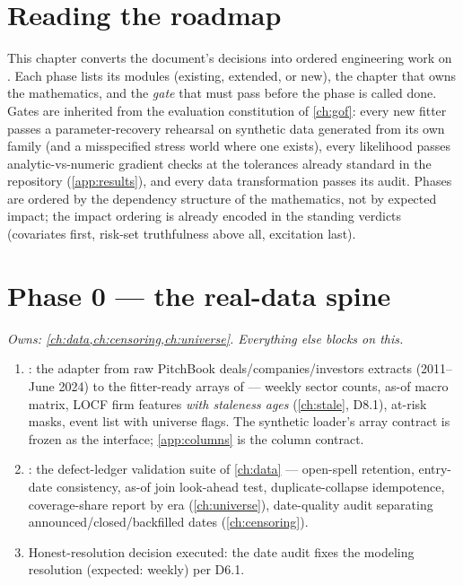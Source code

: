 
\section{Reading the roadmap}\label{ch13:sec:reading}

This chapter converts the document's decisions into ordered engineering
work on \modrepo{}. Each phase lists its modules (existing, extended, or
new), the chapter that owns the mathematics, and the \emph{gate} that
must pass before the phase is called done. Gates are inherited from the
evaluation constitution of \cref{ch:gof}: every new fitter passes a
parameter-recovery rehearsal on synthetic data generated from its own
family (and a misspecified stress world where one exists), every likelihood
passes analytic-vs-numeric gradient checks at the tolerances already
standard in the repository (\cref{app:results}), and every data
transformation passes its audit. Phases are ordered by the dependency
structure of the mathematics, not by expected impact; the impact
ordering is already encoded in the standing verdicts (covariates first,
risk-set truthfulness above all, excitation last).

\section{Phase 0 --- the real-data spine}\label{ch13:sec:phase0}

\emph{Owns: \cref{ch:data,ch:censoring,ch:universe}. Everything else
blocks on this.}

\begin{enumerate}[label=P0.\arabic*,leftmargin=3.2em]
\item {}: the adapter from raw PitchBook
deals/companies/investors extracts (2011--June 2024) to the fitter-ready
arrays of  --- weekly sector counts, as-of
macro matrix, LOCF firm features \emph{with staleness ages}
(\cref{ch:stale}, D8.1), at-risk masks, event list with universe flags.
The synthetic loader's array contract is frozen as the interface;
\cref{app:columns} is the column contract.
\item {}: the defect-ledger validation suite of
\cref{ch:data} --- open-spell retention, entry-date consistency, as-of
join look-ahead test, duplicate-collapse idempotence, coverage-share
report by era (\cref{ch:universe}), date-quality audit separating
announced/closed/backfilled dates (\cref{ch:censoring}).
\item Honest-resolution decision executed: the date audit fixes the
modeling resolution (expected: weekly) per D6.1.
\end{enumerate}

